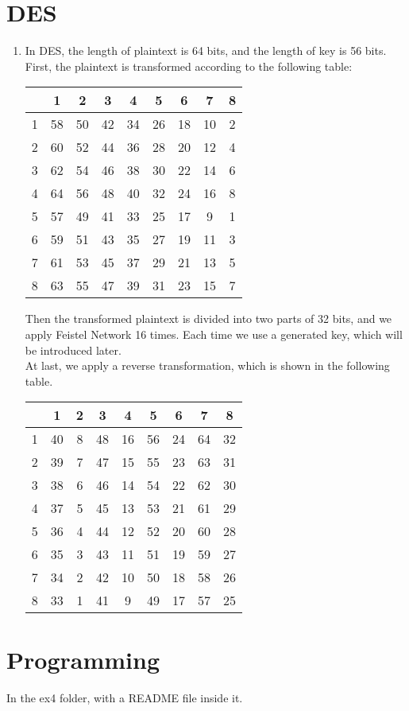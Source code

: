 \documentclass{article}
\begin{document}
\section{DES}
\begin{enumerate}
\item
In DES, the length of plaintext is 64 bits, and the length of key is 56 bits.\\[1mm]
First, the plaintext is transformed according to the following table:
\begin{center}
\begin{tabular}{c|cccccccc}
& 1 & 2 & 3 & 4 & 5 & 6 & 7 & 8 \\
\hline
1 & 58 & 50 & 42 & 34 & 26 & 18 & 10 & 2 \\
2 & 60 & 52 & 44 & 36 & 28 & 20 & 12 & 4 \\
3 & 62 & 54 & 46 & 38 & 30 & 22 & 14 & 6 \\
4 & 64 & 56 & 48 & 40 & 32 & 24 & 16 & 8 \\
5 & 57 & 49 & 41 & 33 & 25 & 17 &  9 & 1 \\
6 & 59 & 51 & 43 & 35 & 27 & 19 & 11 & 3 \\
7 & 61 & 53 & 45 & 37 & 29 & 21 & 13 & 5 \\
8 & 63 & 55 & 47 & 39 & 31 & 23 & 15 & 7 \\
\end{tabular}
\end{center}

Then the transformed plaintext is divided into two parts of 32 bits, and we apply Feistel Network 16 times. Each time we use a generated key, which will be introduced later.\\[1mm]
At last, we apply a reverse transformation, which is shown in the following table.
\begin{center}
\begin{tabular}{c|cccccccc}
& 1 & 2 & 3 & 4 & 5 & 6 & 7 & 8 \\
\hline
1 & 40 & 8 & 48 & 16 & 56 & 24 & 64 & 32 \\
2 & 39 & 7 & 47 & 15 & 55 & 23 & 63 & 31 \\
3 & 38 & 6 & 46 & 14 & 54 & 22 & 62 & 30 \\
4 & 37 & 5 & 45 & 13 & 53 & 21 & 61 & 29 \\
5 & 36 & 4 & 44 & 12 & 52 & 20 & 60 & 28 \\
6 & 35 & 3 & 43 & 11 & 51 & 19 & 59 & 27 \\
7 & 34 & 2 & 42 & 10 & 50 & 18 & 58 & 26 \\
8 & 33 & 1 & 41 &  9 & 49 & 17 & 57 & 25 \\
\end{tabular}
\end{center}



\end{enumerate}

\section{Programming}
In the ex4 folder, with a README file inside it.
\end{document}
